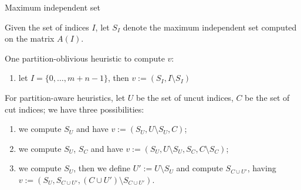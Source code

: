 \begin{frame}{Maximum independent set}

	Given the set of indices $I$, let $S_I$ denote the maximum independent set computed on the matrix $A(I)$.

	One partition-oblivious heuristic to compute $v$: 

	\begin{enumerate}
		\item let $I = \{0,\dots,m+n-1\}$, then $v := (S_I,I \setminus S_I)$
	\end{enumerate}


	For partition-aware heuristics, let $U$ be the set of uncut indices, $C$ be the set of cut indices; we have three possibilities:

\begin{enumerate}\itemsep=0.3cm
	\item we compute $S_U$ and have $v := (S_U,U \setminus S_U, C)$;
	\item we compute $S_U$, $S_C$ and have $v := (S_U, U \setminus S_U, S_C, C \setminus S_C)$;
	\item we compute $S_U$, then we define $U' := U \setminus S_U$ and compute $S_{C \cup U'}$, having $v:= (S_U, S_{C \cup U'}, (C \cup U') \setminus S_{C \cup U'})$.
	\end{enumerate}
\end{frame}
